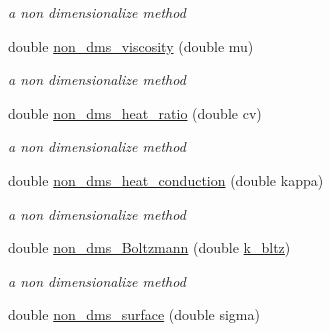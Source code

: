 \begin{CompactItemize}
\begin{CompactList}\small\item\em a non dimensionalize method \item\end{CompactList}\item 
\hypertarget{classInitiation_0d433208c495509df2e2270804b9c2ef}{
double \hyperlink{classInitiation_0d433208c495509df2e2270804b9c2ef}{non\_\-dms\_\-viscosity} (double mu)}
\label{classInitiation_0d433208c495509df2e2270804b9c2ef}

\begin{CompactList}\small\item\em a non dimensionalize method \item\end{CompactList}\item 
\hypertarget{classInitiation_98ded96b747a9ee7512fcc95702b2580}{
double \hyperlink{classInitiation_98ded96b747a9ee7512fcc95702b2580}{non\_\-dms\_\-heat\_\-ratio} (double cv)}
\label{classInitiation_98ded96b747a9ee7512fcc95702b2580}

\begin{CompactList}\small\item\em a non dimensionalize method \item\end{CompactList}\item 
\hypertarget{classInitiation_7d54bcdd903f0d9a0b602008bf9cd10d}{
double \hyperlink{classInitiation_7d54bcdd903f0d9a0b602008bf9cd10d}{non\_\-dms\_\-heat\_\-conduction} (double kappa)}
\label{classInitiation_7d54bcdd903f0d9a0b602008bf9cd10d}

\begin{CompactList}\small\item\em a non dimensionalize method \item\end{CompactList}\item 
\hypertarget{classInitiation_5e09a2250d66d54ef63def3cb9419eae}{
double \hyperlink{classInitiation_5e09a2250d66d54ef63def3cb9419eae}{non\_\-dms\_\-Boltzmann} (double \hyperlink{sph_8cpp_a50583a118c0a3e801d3e48a45b6a259}{k\_\-bltz})}
\label{classInitiation_5e09a2250d66d54ef63def3cb9419eae}

\begin{CompactList}\small\item\em a non dimensionalize method \item\end{CompactList}\item 
\hypertarget{classInitiation_190a357cdd44440885bd5081cc4236a5}{
double \hyperlink{classInitiation_190a357cdd44440885bd5081cc4236a5}{non\_\-dms\_\-surface} (double sigma)}
\label{classInitiation_190a357cdd44440885bd5081cc4236a5}


\end{CompactItemize}
